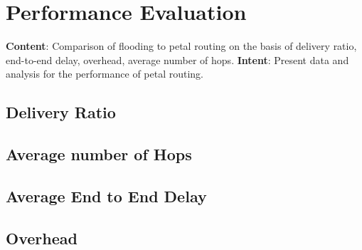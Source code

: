 \chapter{Performance Evaluation}
\textbf{Content}: Comparison of flooding to petal routing on the basis of delivery ratio, end-to-end delay, overhead, average number of hops. 
\textbf{Intent}:  Present data and analysis for the performance of petal routing.

\section{Delivery Ratio}
\section{Average number of Hops}
\section{Average End to End Delay}
\section{Overhead}
